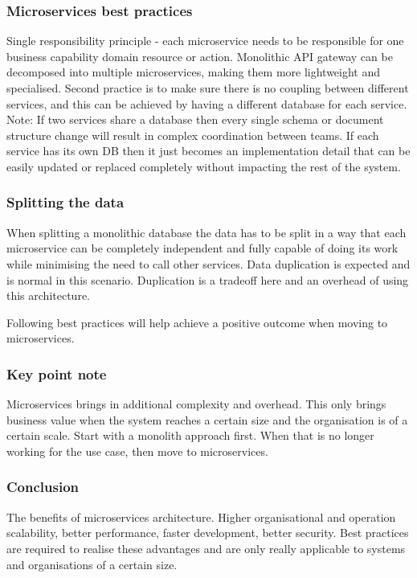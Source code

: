 \subsubsection{Microservices best practices}
Single responsibility principle - each microservice needs to be responsible for one business capability domain resource or action.
Monolithic API gateway can be decomposed into multiple microservices, making them more lightweight and specialised.
Second practice is to make sure there is no coupling between different services, and this can be achieved by having a different database for each service.
Note: If two services share a database then every single schema or document structure change will result in complex coordination between teams.
If each service has its own DB then it just becomes an implementation detail that can be easily updated or replaced completely without impacting the rest of the system.

\subsubsection{Splitting the data}
When splitting a monolithic database the data has to be split in a way that each microservice can be completely independent and fully capable of doing its work while minimising the need to call other services.
Data duplication is expected and is normal in this scenario.
Duplication is a tradeoff here and an overhead of using this architecture.

Following best practices will help achieve a positive outcome when moving to microservices.

\subsubsection{Key point note}
Microservices brings in additional complexity and overhead.
This only brings business value when the system reaches a certain size and the organisation is of a certain scale.
Start with a monolith approach first.
When that is no longer working for the use case, then move to microservices.

\subsubsection{Conclusion}

The benefits of microservices architecture.
Higher organisational and operation scalability, better performance, faster development, better security.
Best practices are required to realise these advantages and are only really applicable to systems and organisations of a certain size.

